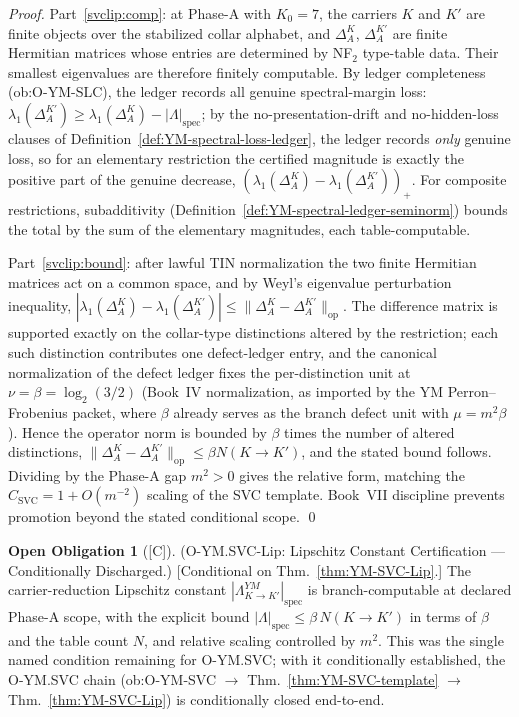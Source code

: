 \documentclass[12pt,oneside]{amsbook}
\theoremstyle{plain}
\theoremstyle{definition}
\newtheorem{obligation}[theorem]{Open Obligation}
\theoremstyle{remark}
\newcommand{\status}[1]{\textup{[#1]}}
\begin{document}
\begin{proof}
Part~\ref{svclip:comp}: at Phase-A with $K_0 = 7$, the carriers
$K$ and $K'$ are finite objects over the stabilized collar
alphabet, and $\Delta_A^K$, $\Delta_A^{K'}$ are finite Hermitian
matrices whose entries are determined by NF$_2$ type-table data.
Their smallest eigenvalues are therefore finitely computable.  By
ledger completeness (ob:O-YM-SLC), the ledger records all genuine
spectral-margin loss:
$\lambda_1(\Delta_A^{K'}) \ge \lambda_1(\Delta_A^K) -
|\Lambda|_{\mathrm{spec}}$; by the no-presentation-drift and
no-hidden-loss clauses of
Definition~\ref{def:YM-spectral-loss-ledger}, the ledger records
\emph{only} genuine loss, so for an elementary restriction the
certified magnitude is exactly the positive part of the genuine
decrease, $(\lambda_1(\Delta_A^K) -
\lambda_1(\Delta_A^{K'}))_{+}$.  For composite restrictions,
subadditivity (Definition~\ref{def:YM-spectral-ledger-seminorm})
bounds the total by the sum of the elementary magnitudes, each
table-computable.

Part~\ref{svclip:bound}: after lawful TIN normalization the two
finite Hermitian matrices act on a common space, and by Weyl's
eigenvalue perturbation inequality,
$|\lambda_1(\Delta_A^K) - \lambda_1(\Delta_A^{K'})| \le
\|\Delta_A^K - \Delta_A^{K'}\|_{\mathrm{op}}$.  The difference
matrix is supported exactly on the collar-type distinctions
altered by the restriction; each such distinction contributes one
defect-ledger entry, and the canonical normalization of the
defect ledger fixes the per-distinction unit at
$\nu = \beta = \log_2(3/2)$ (Book~IV normalization, as imported
by the YM Perron--Frobenius packet, where $\beta$ already serves
as the branch defect unit with $\mu = m^2\beta$).  Hence the
operator norm is bounded by $\beta$ times the number of altered
distinctions, $\|\Delta_A^K - \Delta_A^{K'}\|_{\mathrm{op}}
\le \beta N(K \to K')$, and the stated bound follows.  Dividing
by the Phase-A gap $m^2 > 0$ gives the relative form, matching
the $C_{\mathrm{SVC}} = 1 + O(m^{-2})$ scaling of the SVC
template.  Book~VII discipline prevents promotion beyond the
stated conditional scope. \qed
\end{proof}

\begin{obligation}[\status{C}]\label{ob:O-YM-SVC-Lip}
\textup{(O-YM.SVC-Lip: Lipschitz Constant Certification ---
Conditionally Discharged.)}
\textup{[Conditional on Thm.~\ref{thm:YM-SVC-Lip}.]}
The carrier-reduction Lipschitz constant
$|\Lambda_{K \to K'}^{YM}|_{\mathrm{spec}}$ is branch-computable
at declared Phase-A scope, with the explicit bound
$|\Lambda|_{\mathrm{spec}} \le \beta\,N(K \to K')$ in terms of
$\beta$ and the table count $N$, and relative scaling controlled
by $m^2$.  This was the single named condition remaining for
O-YM.SVC; with it conditionally established, the O-YM.SVC chain
(ob:O-YM-SVC $\to$ Thm.~\ref{thm:YM-SVC-template} $\to$
Thm.~\ref{thm:YM-SVC-Lip}) is conditionally closed end-to-end.
\end{obligation}
\end{document}
